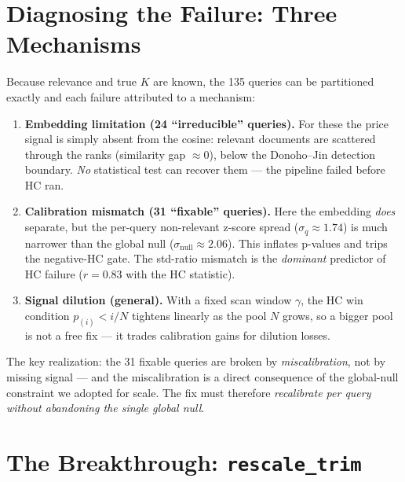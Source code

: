 \documentclass[11pt]{article}
\begin{document}
\section{Diagnosing the Failure: Three Mechanisms}

Because relevance and true $K$ are known, the 135 queries can be partitioned
exactly and each failure attributed to a mechanism:

\begin{enumerate}[leftmargin=2em]
\item \textbf{Embedding limitation (24 ``irreducible'' queries).} For these the
price signal is simply absent from the cosine: relevant documents are scattered
through the ranks (similarity gap $\approx 0$), below the Donoho--Jin detection
boundary. \emph{No} statistical test can recover them --- the pipeline failed
before HC ran.
\item \textbf{Calibration mismatch (31 ``fixable'' queries).} Here the embedding
\emph{does} separate, but the per-query non-relevant z-score spread
($\sigma_q\!\approx\!1.74$) is much narrower than the global null
($\sigma_{\mathrm{null}}\!\approx\!2.06$). This inflates p-values and trips the
negative-HC gate. The std-ratio mismatch is the \emph{dominant} predictor of HC
failure ($r\!=\!0.83$ with the HC statistic).
\item \textbf{Signal dilution (general).} With a fixed scan window $\gamma$, the
HC win condition $p_{(i)}\!<\!i/N$ tightens linearly as the pool $N$ grows, so a
bigger pool is not a free fix --- it trades calibration gains for dilution
losses.
\end{enumerate}

The key realization: the 31 fixable queries are broken by \emph{miscalibration},
not by missing signal --- and the miscalibration is a direct consequence of the
global-null constraint we adopted for scale. The fix must therefore
\emph{recalibrate per query without abandoning the single global null}.

\section{The Breakthrough: \texttt{rescale\_trim}}
\end{document}
